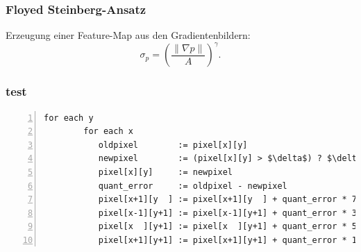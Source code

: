 \documentclass[xcolor=dvipsnames]{beamer}
\begin{document}
\begin{frame}

\end{frame}

\begin{frame}
	\frametitle{Floyed Steinberg-Ansatz}
	
	Erzeugung einer Feature-Map aus den Gradientenbildern:
	\begin{equation}
		\sigma_p = \left( \frac{\parallel \nabla p \parallel}{A} \right)^\gamma.
		\label{eq:featureMap}
	\end{equation}
	
\end{frame}

\begin{frame}[fragile]
	\frametitle{test}
	\begin{tiny}
	
	\begin{lstlisting}[numbers=left,
					   mathescape=true,
					   xleftmargin=0.1\textwidth,
					   captionpos=b,
					   caption={Floyd-Steinberg-Algorithmus}]
	for each y
		for each x
		   oldpixel        := pixel[x][y]
		   newpixel        := (pixel[x][y] > $\delta$) ? $\delta$ : 0
		   pixel[x][y]     := newpixel
		   quant_error     := oldpixel - newpixel
		   pixel[x+1][y  ] := pixel[x+1][y  ] + quant_error * 7 / 16
		   pixel[x-1][y+1] := pixel[x-1][y+1] + quant_error * 3 / 16
		   pixel[x  ][y+1] := pixel[x  ][y+1] + quant_error * 5 / 16
		   pixel[x+1][y+1] := pixel[x+1][y+1] + quant_error * 1 / 16
	\end{lstlisting}
	
	\end{tiny}
\end{frame}

\begin{frame}
		
\end{frame}
\end{document}
